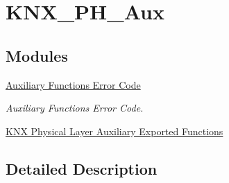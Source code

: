 \hypertarget{group___k_n_x___p_h___aux}{}\section{K\+N\+X\+\_\+\+P\+H\+\_\+\+Aux}
\label{group___k_n_x___p_h___aux}
\subsection*{Modules}
\begin{DoxyCompactItemize}
\item 
\hyperlink{group___k_n_x___aux___error___code}{Auxiliary Functions\textquotesingle{} Error Code}
\begin{DoxyCompactList}\small\item\em Auxiliary Functions\textquotesingle{} Error Code. \end{DoxyCompactList}\item 
\hyperlink{group___k_n_x___aux___exported___functions}{K\+N\+X Physical Layer Auxiliary Exported Functions}
\end{DoxyCompactItemize}


\subsection{Detailed Description}

